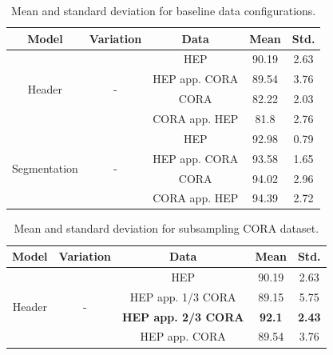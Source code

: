 \begin{table}[t]
\begin{center}
\begin{tabular}{|c|c|c|c|c|}
\hline
Model & Variation & Data & Mean & Std.\\
\hline
\multirow{4}{*}{Header} & \multirow{4}{*}{-} & HEP & 90.19 & 2.63\\\cline{3-5}
& & HEP app. CORA & 89.54 & 3.76\\\cline{3-5}
& & CORA & 82.22 & 2.03\\\cline{3-5}
& & CORA app. HEP & 81.8 & 2.76\\\cline{3-5}
\hline
\multirow{4}{*}{Segmentation} & \multirow{4}{*}{-} & HEP & 92.98 & 0.79\\\cline{3-5}
& & HEP app. CORA & 93.58 & 1.65\\\cline{3-5}
& & CORA & 94.02 & 2.96\\\cline{3-5}
& & CORA app. HEP & 94.39 & 2.72\\\cline{3-5}
\hline
\end{tabular}
\caption{Mean and standard deviation for baseline data configurations.}
\label{table:baselineresults}
\end{center}
\end{table}

\begin{table}[t]
\begin{center}
\begin{tabular}{|c|c|c|c|c|}
\hline
Model & Variation & Data & Mean & Std.\\
\hline
\multirow{4}{*}{Header} & \multirow{4}{*}{-} & HEP & 90.19 & 2.63\\\cline{3-5}
& & HEP app. 1/3 CORA & 89.15 & 5.75\\\cline{3-5}
& & \textbf{HEP app. 2/3 CORA} & \textbf{92.1} & \textbf{2.43}\\\cline{3-5}
& & HEP app. CORA & 89.54 & 3.76\\\cline{3-5}
\hline
\end{tabular}
\caption{Mean and standard deviation for subsampling CORA dataset.}
\label{table:subsampling}
\end{center}
\end{table}

